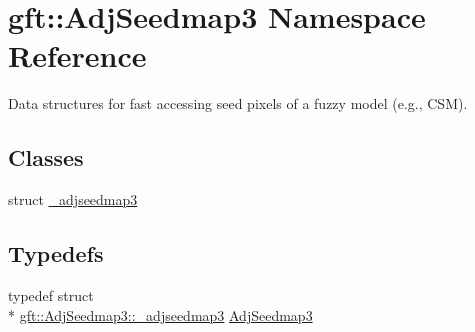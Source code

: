 \hypertarget{namespacegft_1_1AdjSeedmap3}{\section{gft\-:\-:Adj\-Seedmap3 Namespace Reference}
\label{namespacegft_1_1AdjSeedmap3}
}


Data structures for fast accessing seed pixels of a fuzzy model (e.\-g., C\-S\-M).  


\subsection*{Classes}
\begin{DoxyCompactItemize}
\item 
struct \hyperlink{structgft_1_1AdjSeedmap3_1_1__adjseedmap3}{\-\_\-adjseedmap3}
\end{DoxyCompactItemize}
\subsection*{Typedefs}
\begin{DoxyCompactItemize}
\item 
typedef struct \\*
\hyperlink{structgft_1_1AdjSeedmap3_1_1__adjseedmap3}{gft\-::\-Adj\-Seedmap3\-::\-\_\-adjseedmap3} \hyperlink{namespacegft_1_1AdjSeedmap3_a5af15912c0c5243c6d835f204006b32a}{Adj\-Seedmap3}
\end{DoxyCompactItemize}
